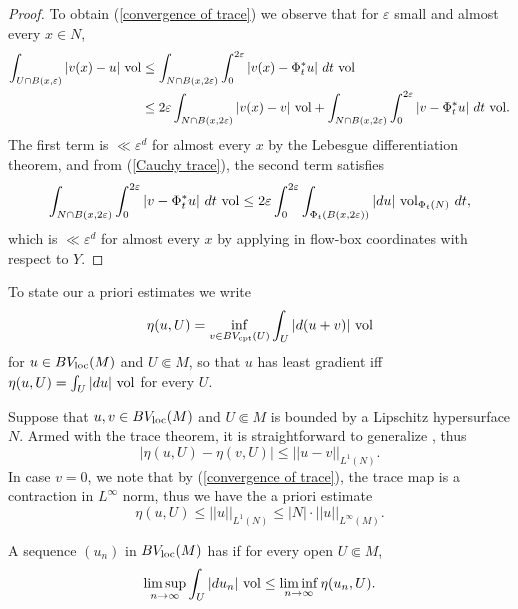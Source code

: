 \begin{proof}
To obtain (\ref{convergence of trace}) we observe that for $\varepsilon$ small and almost every $x \in N$,
\begin{align*}
\int_{U \cap B(x, \varepsilon)} |v(x) - u| ~\mathrm{vol} &\leq \int_{N \cap B(x, 2\varepsilon)} \int_0^{2\varepsilon} |v(x) - \Phi_t^* u| ~dt ~\mathrm{vol}\\
&\leq 2\varepsilon \int_{N \cap B(x, 2\varepsilon)} |v(x) - v| ~\mathrm{vol} + \int_{N \cap B(x, 2\varepsilon)} \int_0^{2\varepsilon} |v - \Phi_t^* u| ~dt ~\mathrm{vol}.
\end{align*}
The first term is $\ll \varepsilon^d$ for almost every $x$ by the Lebesgue differentiation theorem, and from (\ref{Cauchy trace}), the second term satisfies 
$$\int_{N \cap B(x, 2\varepsilon)} \int_0^{2\varepsilon} |v - \Phi_t^* u| ~dt ~\mathrm{vol} \leq 2\varepsilon \int_0^{2\varepsilon} \int_{\Phi_t(B(x, 2\varepsilon))} |du| ~\mathrm{vol}_{\Phi_t(N)} ~dt,$$
which is $\ll \varepsilon^d$ for almost every $x$ by applying \cite[Lemma 1]{Miranda67} in flow-box coordinates with respect to $Y$.
\end{proof}

To state our a priori estimates we write
$$\eta(u, U) = \inf_{v \in BV_{\mathrm{cpt}}(U)} \int_U |d(u+v)| ~\mathrm{vol}$$
for $u \in BV_{\mathrm{loc}}(M)$ and $U \Subset M$, so that $u$ has least gradient iff $\eta(u, U) = \int_U |du| ~\mathrm{vol}$ for every $U$.

Suppose that $u, v \in BV_{\mathrm{loc}}(M)$ and $U \Subset M$ is bounded by a Lipschitz hypersurface $N$. Armed with the trace theorem, it is straightforward to generalize \cite[Lemma 5.6]{Giusti77}, thus
\begin{equation}
|\eta(u, U) - \eta(v, U)| \leq ||u - v||_{L^1(N)}. \label{a priori estimate 1}
\end{equation}
In case $v = 0$, we note that by (\ref{convergence of trace}), the trace map is a contraction in $L^\infty$ norm, thus we have the a priori estimate
\begin{equation}
\eta(u, U) \leq ||u||_{L^1(N)} \leq |N| \cdot ||u||_{L^\infty(M)}. \label{a priori estimate 2}
\end{equation}

\begin{definition}
A sequence $(u_n)$ in $BV_{\mathrm{loc}}(M)$ has  if for every open $U \Subset M$,
$$\limsup_{n \to \infty} \int_U |du_n| ~\mathrm{vol} \leq \liminf_{n \to \infty} \eta(u_n, U).$$
\end{definition}


